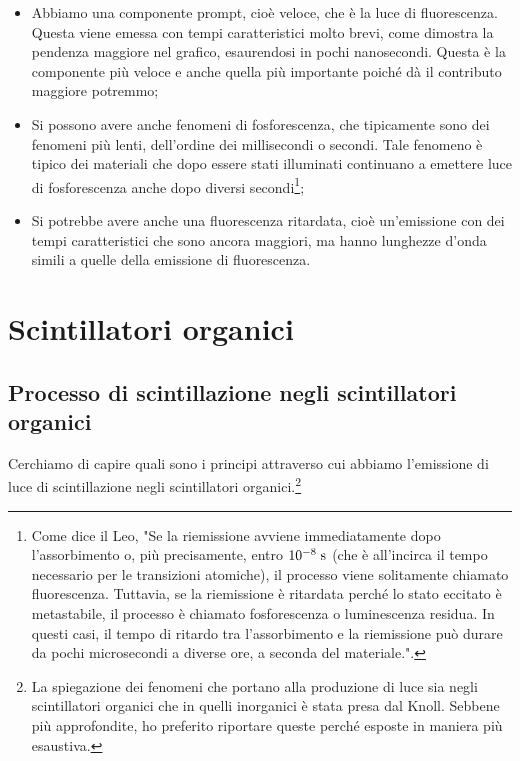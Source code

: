 \begin{itemize}[leftmargin=0.5cm]
   \item Abbiamo una componente prompt, cioè veloce, che è la luce di fluorescenza. Questa viene emessa con tempi caratteristici molto brevi, come dimostra la pendenza maggiore nel grafico, esaurendosi in pochi nanosecondi. Questa è la componente più veloce e anche quella più importante poiché dà il contributo maggiore potremmo;
   \item Si possono avere anche fenomeni di fosforescenza, che tipicamente sono dei fenomeni più lenti, dell'ordine dei millisecondi o secondi. Tale fenomeno è tipico dei materiali che dopo essere stati illuminati continuano a emettere luce di fosforescenza anche dopo diversi secondi\footnote{Come dice il Leo, "Se la riemissione avviene immediatamente dopo l'assorbimento o, più precisamente, entro $10^{-8} \; \rm s$ (che è all'incirca il tempo necessario per le transizioni atomiche), il processo viene solitamente chiamato fluorescenza. Tuttavia, se la riemissione è ritardata perché lo stato eccitato è metastabile, il processo è chiamato fosforescenza o luminescenza residua. In questi casi, il tempo di ritardo tra l'assorbimento e la riemissione può durare da pochi microsecondi a diverse ore, a seconda del materiale.".};
   \item Si potrebbe avere anche una fluorescenza ritardata, cioè un'emissione con dei tempi caratteristici che sono ancora maggiori, ma hanno lunghezze d'onda simili a quelle della emissione di fluorescenza.
\end{itemize}


\section{Scintillatori organici}

\subsection{Processo di scintillazione negli scintillatori organici}

Cerchiamo di capire quali sono i principi attraverso cui abbiamo l'emissione di luce di scintillazione negli scintillatori organici.\footnote{La spiegazione dei fenomeni che portano alla produzione di luce sia negli scintillatori organici che in quelli inorganici è stata presa dal Knoll. Sebbene più approfondite, ho preferito riportare queste perché esposte in maniera più esaustiva.}

